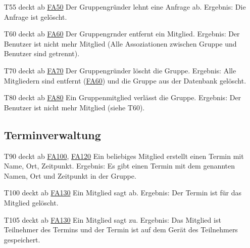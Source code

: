 \documentclass{scrartcl}
\begin{document}
\begin{itemize}
		\item[T55] deckt ab \hyperlink{FA50}{FA50}  \newline
		Der Gruppengründer lehnt eine Anfrage ab. \newline
		Ergebnis: Die Anfrage ist gelöscht.

		\item[T60] deckt ab \hyperlink{FA60}{FA60}  \newline
		Der \gls{Gruppengrnder} entfernt ein \gls{Mitglied}.  \newline
		Ergebnis: Der Benutzer ist nicht mehr Mitglied (Alle Assoziationen zwischen Gruppe und Benutzer sind getrennt).

		\item[T70] deckt ab \hyperlink{FA70}{FA70}  \newline
		Der Gruppengründer löscht die Gruppe.  \newline
		Ergebnis: Alle Mitgliedern sind entfernt (\hyperlink{FA60}{FA60}) und die Gruppe aus der Datenbank gelöscht.

		\item[T80] deckt ab \hyperlink{FA80}{FA80}  \newline
		Ein Gruppenmitglied verlässt die Gruppe.  \newline
		Ergebnis: Der Benutzer ist nicht mehr Mitglied (siehe T60).

	\subsection{Terminverwaltung}

		\item[T90] deckt ab \hyperlink{FA100}{FA100}, \hyperlink{FA120}{FA120}  \newline
		Ein beliebiges \gls{Mitglied} erstellt einen Termin mit Name, Ort, Zeitpunkt.  \newline
		Ergebnis: Es gibt einen Termin mit dem genannten Namen, Ort und Zeitpunkt in der Gruppe.
		
		\item [T100] deckt ab \hyperlink{FA130}{FA130}  \newline
		Ein Mitglied sagt ab.  \newline
		Ergebnis: Der Termin ist für das Mitglied gelöscht.

		\item[T105] deckt ab \hyperlink{FA130}{FA130}  \newline
		Ein Mitglied sagt zu.  \newline
		Ergebnis: Das Mitglied ist \gls{Teilnehmer} des Termins und der Termin ist auf dem Gerät des Teilnehmers gespeichert.


\end{itemize}
\end{document}

